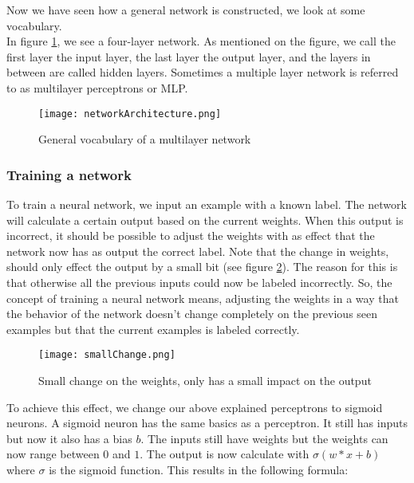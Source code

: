 Now we have seen how a general network is constructed, we look at some vocabulary. \\
In figure \ref{fig:networkArch}, we see a four-layer network. As mentioned on the figure, we call the first layer the input layer, the last layer the output layer, and the layers in between are called hidden layers. Sometimes a multiple layer network is referred to as multilayer perceptrons or MLP. 

\begin{figure}[!htb]
	\centering
	\texttt{[image: networkArchitecture.png]}
	\caption{General vocabulary of a multilayer network \cite{NNintro:online}}
	\label{fig:networkArch}
\end{figure} 		


		\subsubsection{Training a network}
		
To train a neural network, we input an example with a known label. The network will calculate a certain output based on the current weights. When this output is incorrect, it should be possible to adjust the weights with as effect that the network now has as output the correct label. Note that the change in weights, should only effect the output by a small bit (see figure \ref{fig:smallChange}). The reason for this is that otherwise all the previous inputs could now be labeled incorrectly. So, the concept of training a neural network means, adjusting the weights in a way that the behavior of the network doesn't change completely on the previous seen examples but that the current examples is labeled correctly. \\

\begin{figure}[!htb]
	\centering
	\texttt{[image: smallChange.png]}
	\caption{Small change on the weights, only has a small impact on the output \cite{NNintro:online}}
	\label{fig:smallChange}
\end{figure} 

To achieve this effect, we change our above explained perceptrons to sigmoid neurons. A sigmoid neuron has the same basics as a perceptron. It still has inputs but now it also has a bias $b$. The inputs still have weights but the weights can now range between $0$ and $1$. The output is now calculate with $\sigma(w*x+b)$ where $\sigma$ is the sigmoid function. This results in the following formula: 

